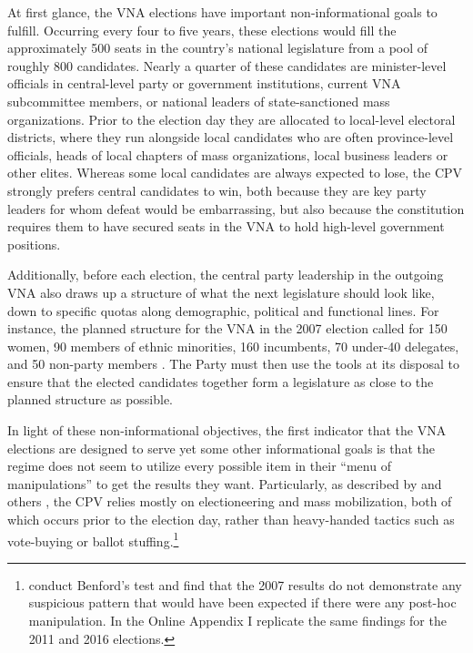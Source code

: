 \documentclass[12pt]{article}
\newcommand{\1}{\mathbbm{1}}
\begin{document}
At first glance, the VNA elections have important non-informational goals to fulfill. Occurring every four to five years, these elections would fill the approximately 500 seats in the country's national legislature from a pool of roughly 800 candidates. Nearly a quarter of these candidates are minister-level officials in central-level party or government institutions, current VNA subcommittee members, or national leaders of state-sanctioned mass organizations. Prior to the election day they are allocated to local-level electoral districts, where they run alongside local candidates who are often province-level officials, heads of local chapters of mass organizations, local business leaders or other elites. Whereas some local candidates are always expected to lose, the CPV strongly prefers central candidates to win, both because they are key party leaders for whom defeat would be embarrassing, but also because the constitution requires them to have secured seats in the VNA to hold high-level government positions.

Additionally, before each election, the central party leadership in the outgoing VNA also draws up a structure of what the next legislature should look like, down to specific quotas along demographic, political and functional lines. For instance, the planned structure for the VNA in the 2007 election called for 150 women, 90 members of ethnic minorities, 160 incumbents, 70 under-40 delegates, and 50 non-party members  \citep[506]{MaleskySchuler2011}. The Party must then use the tools at its disposal to ensure that the elected candidates together form a legislature as close to the planned structure as possible.

In light of these non-informational objectives, the first indicator that the VNA elections are designed to serve yet some other informational goals is that the regime does not seem to utilize every possible item in their ``menu of manipulations'' \citep[to quote][]{Schedler2002menu} to get the results they want. Particularly, as described by \citet{MaleskySchuler2011} and others \citep[e.g][]{Gainsborough2005}, the CPV relies mostly on electioneering and mass mobilization, both of which occurs prior to the election day, rather than heavy-handed tactics such as vote-buying or ballot stuffing.\footnote{\citet{MaleskySchuler2011} conduct Benford's test and find that the 2007 results do not demonstrate any suspicious pattern that would have been expected if there were any post-hoc manipulation. In the Online Appendix I replicate the same findings for the 2011 and 2016 elections.}
\end{document}
